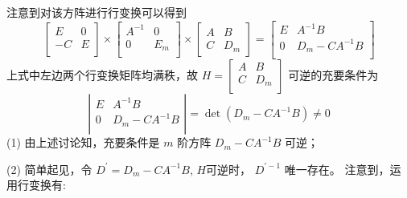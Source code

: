 \documentclass{article}
\begin{document}
\begin{enumerate}
    注意到对该方阵进行行变换可以得到 
    \begin{equation*}
        \left[
            \begin{array}{cc}
                E & 0 \\
                -C & E \\
            \end{array}
        \right]
        \times
        \left[
            \begin{array}{cc}
                A^{-1} & 0 \\
                0 & E_m \\
            \end{array}
        \right]
        \times
        \left[
            \begin{array}{cc}
                A & B \\
                C & D_m
            \end{array}
        \right]
        = 
        \left[
            \begin{array}{cc}
                E & A^{-1}B \\
                0 & D_m - CA^{-1}B \\
            \end{array}
        \right]
    \end{equation*}
    上式中左边两个行变换矩阵均满秩，故 $H=\left[\begin{array}{cc}A&B\\C&D_m\\\end{array}\right]$ 可逆的充要条件为
    \begin{equation*}
        \left|
            \begin{array}{cc}
                E & A^{-1}B \\
                0 & D_m - CA^{-1}B \\
            \end{array}
        \right|
        = \det(D_m - CA^{-1}B)\ne 0
    \end{equation*}
    (1) 由上述讨论知，充要条件是 $m$ 阶方阵 $D_m-CA^{-1}B$ 可逆；
    
    (2) 简单起见，令 $D^\prime=D_m-CA^{-1}B$, $H$可逆时， $D^{\prime-1}$ 唯一存在。
    注意到，运用行变换有:


\end{enumerate}
\end{document}
